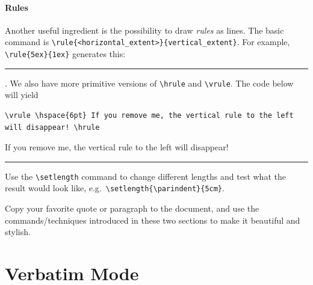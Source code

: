 \paragraph{Rules}
Another useful ingredient is the possibility to draw \textit{rules} as lines. The basic command is \texttt{\textbackslash rule\{<horizontal\_extent>\}\{vertical\_extent\}}. For example, \texttt{\textbackslash rule\{5ex\}\{1ex\}} generates this: \rule{5ex}{1ex}. We also have more primitive versions of \texttt{\textbackslash hrule} and \texttt{\textbackslash vrule}. The code below will yield
\begin{lstlisting}
\vrule \hspace{6pt} If you remove me, the vertical rule to the left will disappear! \hrule
\end{lstlisting}
\vrule \hspace{6pt} If you remove me, the vertical rule to the left will disappear!  \hrule

\begin{exercisebox}
\begin{Exercise}
Use the \texttt{\textbackslash setlength} command to change different lengths and test what the result would look like, e.g.\ \texttt{\textbackslash setlength\{\textbackslash parindent\}\{5cm\}}.
\end{Exercise}
\begin{Exercise}
Copy your favorite quote or paragraph to the document, and use the commands/techniques introduced in these two sections to make it beautiful and stylish.    
\end{Exercise}
\end{exercisebox}

\section{Verbatim Mode}

